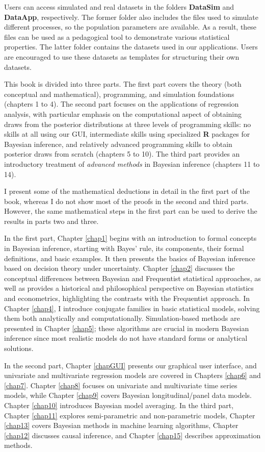 Users can access simulated and real datasets in the folders \textbf{DataSim} and \textbf{DataApp}, respectively. The former folder also includes the files used to simulate different processes, so the population parameters are available. As a result, these files can be used as a pedagogical tool to demonstrate various statistical properties. The latter folder contains the datasets used in our applications. Users are encouraged to use these datasets as templates for structuring their own datasets.

This book is divided into three parts. The first part covers the theory (both conceptual and mathematical), programming, and simulation foundations (chapters 1 to 4). The second part focuses on the applications of regression analysis, with particular emphasis on the computational aspect of obtaining draws from the posterior distributions at three levels of programming skills: no skills at all using our GUI, intermediate skills using specialized \textbf{R} packages for Bayesian inference, and relatively advanced programming skills to obtain posterior draws from scratch (chapters 5 to 10). The third part provides an introductory treatment of \textit{advanced methods} in Bayesian inference (chapters 11 to 14). 

I present some of the mathematical deductions in detail in the first part of the book, whereas I do not show most of the proofs in the second and third parts. However, the same mathematical steps in the first part can be used to derive the results in parts two and three.

In the first part, Chapter \ref{chap1} begins with an introduction to formal concepts in Bayesian inference, starting with Bayes' rule, its components, their formal definitions, and basic examples. It then presents the basics of Bayesian inference based on decision theory under uncertainty. Chapter \ref{chap2} discusses the conceptual differences between Bayesian and Frequentist statistical approaches, as well as provides a historical and philosophical perspective on Bayesian statistics and econometrics, highlighting the contrasts with the Frequentist approach. In Chapter \ref{chap4}, I introduce conjugate families in basic statistical models, solving them both analytically and computationally. Simulation-based methods are presented in Chapter \ref{chap5}; these algorithms are crucial in modern Bayesian inference since most realistic models do not have standard forms or analytical solutions. 

In the second part, Chapter \ref{chapGUI} presents our graphical user interface, and univariate and multivariate regression models are covered in Chapters \ref{chap6} and \ref{chap7}. Chapter \ref{chap8} focuses on univariate and multivariate time series models, while Chapter \ref{chap9} covers Bayesian longitudinal/panel data models. Chapter \ref{chap10} introduces Bayesian model averaging. In the third part, Chapter \ref{chap11} explores semi-parametric and non-parametric models, Chapter \ref{chap13} covers Bayesian methods in machine learning algorithms, Chapter \ref{chap12} discusses causal inference, and Chapter \ref{chap15} describes approximation methods.

